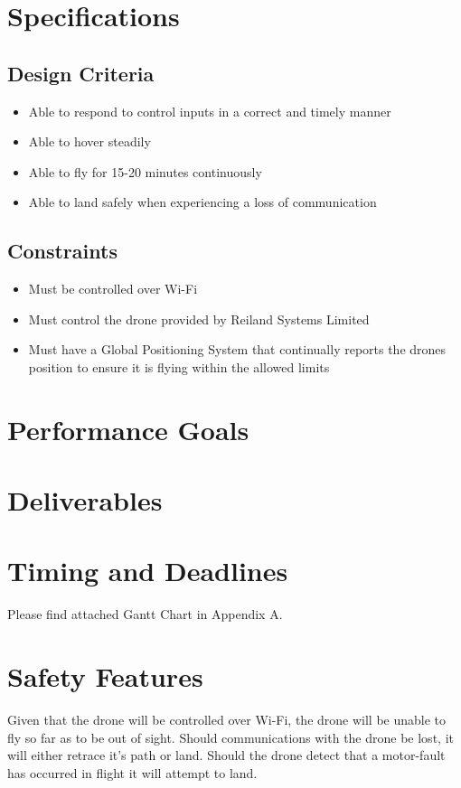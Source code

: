 \documentclass[draft]{article}
\begin{document}
\section{Specifications}
\subsection{Design Criteria}
\begin{itemize}
	\item Able to respond to control inputs in a correct and timely manner
	\item Able to hover steadily 
	\item Able to fly for 15-20 minutes continuously
	\item Able to land safely when experiencing a loss of communication
\end{itemize}
\subsection{Constraints}
\begin{itemize}
	\item Must be controlled over Wi-Fi
	\item Must control the drone provided by Reiland Systems Limited
	\item Must have a Global Positioning System that continually reports the drones position to ensure it is flying within the allowed limits
\end{itemize}
\section{Performance Goals}

\section{Deliverables}

\section{Timing and Deadlines}
Please find attached Gantt Chart in Appendix A.
\section{Safety Features}
Given that the drone will be controlled over Wi-Fi, the drone will be unable to fly so far as to be out of sight.  Should communications with the drone be lost, it will either retrace it's path or land.  Should the drone detect that a motor-fault has occurred in flight it will attempt to land.
\end{document}

